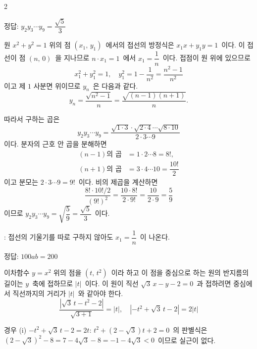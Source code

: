 \documentclass[10pt,fleqn]{article}
\begin{document}
\begin{multicols*}{2}
\begin{dmanswerbox}
정답: $y_2 y_3 \cdots y_9 = \dfrac{\sqrt{5}}{3}$
\end{dmanswerbox}

원 $x^2 + y^2 = 1$ 위의 점 $(x_1,\, y_1)$\ 에서의 접선의 방정식은 $x_1 x + y_1 y = 1$\ 이다. 이 접선이 점 $(n,\, 0)$\ 을 지나므로 $n \cdot x_1 = 1$\ 에서 $x_1 = \dfrac{1}{n}$\ 이다. 접점이 원 위에 있으므로
\[ x_1^2 + y_1^2 = 1,\quad y_1^2 = 1 - \dfrac{1}{n^2} = \dfrac{n^2 - 1}{n^2} \]
이고 제 $1$ 사분면 위이므로 $y_n$\ 은 다음과 같다.
\[ y_n = \dfrac{\sqrt{n^2 - 1}}{n} = \dfrac{\sqrt{(n-1)(n+1)}}{n}. \]

따라서 구하는 곱은
\[ y_2 y_3 \cdots y_9 = \dfrac{\sqrt{1 \cdot 3} \cdot \sqrt{2 \cdot 4} \cdots \sqrt{8 \cdot 10}}{2 \cdot 3 \cdots 9} \]
이다. 분자의 근호 안 곱을 분해하면
\begin{align*}
  (n-1)\text{의 곱} &= 1 \cdot 2 \cdots 8 = 8!,\\
  (n+1)\text{의 곱} &= 3 \cdot 4 \cdots 10 = \dfrac{10!}{2}
\end{align*}
이고 분모는 $2 \cdot 3 \cdots 9 = 9!$\ 이다. 비의 제곱을 계산하면
\[ \dfrac{8! \cdot 10!/2}{(9!)^2} = \dfrac{10 \cdot 8!}{2 \cdot 9!} = \dfrac{10}{2 \cdot 9} = \dfrac{5}{9} \]
이므로 $y_2 y_3 \cdots y_9 = \sqrt{\dfrac{5}{9}} = \dfrac{\sqrt{5}}{3}$\ 이다.

\begin{dmcriticalpoint}
: 접선의 기울기를 따로 구하지 않아도 $x_1 = \dfrac{1}{n}$\ 이 나온다.
\end{dmcriticalpoint}

\begin{dmanswerbox}
정답: $100ab=200$
\end{dmanswerbox}

이차함수 $y = x^2$ 위의 점을 $(t,\, t^2)$\ 이라 하고 이 점을 중심으로 하는 원의 반지름의 길이는 $y$\ 축에 접하므로 $|t|$\ 이다. 이 원이 직선 $\sqrt{3}\, x - y - 2 = 0$\ 과 접하려면 중심에서 직선까지의 거리가 $|t|$\ 와 같아야 한다.
\[ \dfrac{|\sqrt{3}\, t - t^2 - 2|}{\sqrt{3 + 1}} = |t|,\quad |{-t^2 + \sqrt{3}\, t - 2}| = 2|t| \]

경우 (i) $-t^2 + \sqrt{3}\, t - 2 = 2t$: $t^2 + (2 - \sqrt{3})t + 2 = 0$\ 의 판별식은 $(2-\sqrt{3})^2 - 8 = 7 - 4\sqrt{3} - 8 = -1 - 4\sqrt{3} < 0$\ 이므로 실근이 없다.


\end{multicols*}
\end{document}
